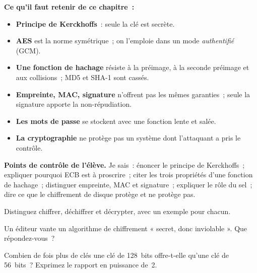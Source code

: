 \separateur

\begin{boxresume}
\textbf{Ce qu'il faut retenir de ce chapitre~:}
\begin{itemize}
    \item \textbf{Principe de Kerckhoffs}~: seule la clé est secrète.
    \item \textbf{AES} est la norme symétrique~; on l'emploie dans un mode
          \emph{authentifié} (GCM).
    \item \textbf{Une fonction de hachage} résiste à la préimage, à la
          seconde préimage et aux collisions~; MD5 et SHA-1 sont cassés.
    \item \textbf{Empreinte, MAC, signature} n'offrent pas les mêmes
          garanties~; seule la signature apporte la non-répudiation.
    \item \textbf{Les mots de passe} se stockent avec une fonction lente et
          salée.
    \item \textbf{La cryptographie} ne protège pas un système dont
          l'attaquant a pris le contrôle.
\end{itemize}
\end{boxresume}

\begin{boxinfo}
\textbf{Points de contrôle de l'élève.} Je sais~: énoncer le principe de
Kerckhoffs~; expliquer pourquoi ECB est à proscrire~; citer les trois
propriétés d'une fonction de hachage~; distinguer empreinte, MAC et
signature~; expliquer le rôle du sel~; dire ce que le chiffrement de
disque protège et ne protège pas.
\end{boxinfo}

\bigskip

\begin{boxexo}[title={\ding{45}\quad Exercice~3.1. Vocabulaire \niveaubase}]
Distinguez chiffrer, déchiffrer et décrypter, avec un exemple pour chacun.
\end{boxexo}

\begin{boxexo}[title={\ding{45}\quad Exercice~3.2. Kerckhoffs \niveaubase}]
Un éditeur vante un algorithme de chiffrement « secret, donc
inviolable ». Que répondez-vous~?
\end{boxexo}

\begin{boxexo}[title={\ding{45}\quad Exercice~3.3. Force brute \niveaubase}]
Combien de fois plus de clés une clé de 128~bits offre-t-elle qu'une clé
de 56~bits~? Exprimez le rapport en puissance de~2.
\end{boxexo}

